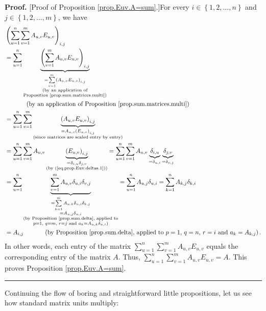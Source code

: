 \documentclass[numbers=enddot,12pt,final,onecolumn,notitlepage]{scrartcl}%
\theoremstyle{definition}
\newenvironment{proof}[1][Proof]{\noindent\textbf{#1.} }{\ \rule{0.5em}{0.5em}}
\let\sumnonlimits\sum
\renewcommand{\sum}{\sumnonlimits\limits}
\begin{document}
\begin{proof}
[Proof of Proposition \ref{prop.Euv.A=sum}.]For every $i\in\left\{
1,2,\ldots,n\right\}  $ and $j\in\left\{  1,2,\ldots,m\right\}  $, we have%
\begin{align*}
&  \left(  \sum_{u=1}^{n}\sum_{v=1}^{m}A_{u,v}E_{u,v}\right)  _{i,j}\\
&  =\sum_{u=1}^{n}\underbrace{\left(  \sum_{v=1}^{m}A_{u,v}E_{u,v}\right)
_{i,j}}_{\substack{=\sum_{v=1}^{m}\left(  A_{u,v}E_{u,v}\right)
_{i,j}\\\text{(by an application of}\\\text{Proposition
\ref{prop.sum.matrices.multi})}}}\\
&  \ \ \ \ \ \ \ \ \ \ \left(  \text{by an application of Proposition
\ref{prop.sum.matrices.multi}}\right) \\
&  =\sum_{u=1}^{n}\sum_{v=1}^{m}\underbrace{\left(  A_{u,v}E_{u,v}\right)
_{i,j}}_{\substack{=A_{u,v}\left(  E_{u,v}\right)  _{i,j}\\\text{(since
matrices are scaled entry by entry)}}}\\
&  =\sum_{u=1}^{n}\sum_{v=1}^{m}A_{u,v}\underbrace{\left(  E_{u,v}\right)
_{i,j}}_{\substack{=\delta_{i,u}\delta_{j,v}\\\text{(by
(\ref{eq.prop.Euv.deltas.1}))}}}=\sum_{u=1}^{n}\sum_{v=1}^{m}A_{u,v}%
\underbrace{\delta_{i,u}}_{=\delta_{u,i}}\underbrace{\delta_{j,v}}%
_{=\delta_{v,j}}\\
&  =\sum_{u=1}^{n}\underbrace{\sum_{v=1}^{m}A_{u,v}\delta_{u,i}\delta_{v,j}%
}_{\substack{=\sum_{k=1}^{m}A_{u,k}\delta_{u,i}\delta_{k,j}\\=A_{u,j}%
\delta_{u,i}\\\text{(by Proposition \ref{prop.sum.delta}, applied
to}\\p=1\text{, }q=m\text{, }r=j\text{ and }a_{k}=A_{u,k}\delta_{u,i}\text{)}%
}}=\sum_{u=1}^{n}A_{u,j}\delta_{u,i}=\sum_{k=1}^{n}A_{k,j}\delta_{k,i}\\
&  =A_{i,j}\ \ \ \ \ \ \ \ \ \ \left(  \text{by Proposition
\ref{prop.sum.delta}, applied to }p=1\text{, }q=n\text{, }r=i\text{ and }%
a_{k}=A_{k,j}\right)  .
\end{align*}
In other words, each entry of the matrix $\sum_{u=1}^{n}\sum_{v=1}^{m}%
A_{u,v}E_{u,v}$ equals the corresponding entry of the matrix $A$. Thus,
$\sum_{u=1}^{n}\sum_{v=1}^{m}A_{u,v}E_{u,v}=A$. This proves Proposition
\ref{prop.Euv.A=sum}.
\end{proof}

Continuing the flow of boring and straightforward little propositions, let us
see how standard matrix units multiply:
\end{document}
